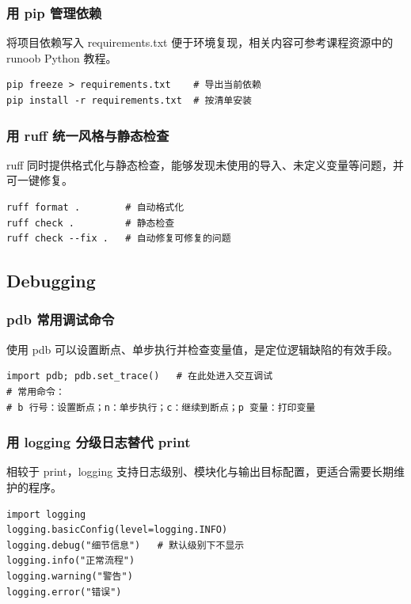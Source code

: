 \subsubsection{用 pip 管理依赖}
将项目依赖写入 requirements.txt 便于环境复现，相关内容可参考课程资源中的 runoob Python 教程。
\begin{verbatim}
pip freeze > requirements.txt    # 导出当前依赖
pip install -r requirements.txt  # 按清单安装
\end{verbatim}

\subsubsection{用 ruff 统一风格与静态检查}
ruff 同时提供格式化与静态检查，能够发现未使用的导入、未定义变量等问题，并可一键修复。
\begin{verbatim}
ruff format .        # 自动格式化
ruff check .         # 静态检查
ruff check --fix .   # 自动修复可修复的问题
\end{verbatim}

\subsection{Debugging}

\subsubsection{pdb 常用调试命令}
使用 pdb 可以设置断点、单步执行并检查变量值，是定位逻辑缺陷的有效手段。
\begin{verbatim}
import pdb; pdb.set_trace()   # 在此处进入交互调试
# 常用命令：
# b 行号：设置断点；n：单步执行；c：继续到断点；p 变量：打印变量
\end{verbatim}

\subsubsection{用 logging 分级日志替代 print}
相较于 print，logging 支持日志级别、模块化与输出目标配置，更适合需要长期维护的程序。
\begin{verbatim}
import logging
logging.basicConfig(level=logging.INFO)
logging.debug("细节信息")   # 默认级别下不显示
logging.info("正常流程")
logging.warning("警告")
logging.error("错误")
\end{verbatim}

